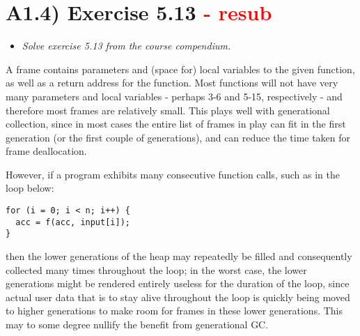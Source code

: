 
\newpage
\section{A1.4) Exercise 5.13 \textcolor{red}{- resub}}

\begin{itemize}
  \item \emph{Solve exercise 5.13 from the course compendium.}
\end{itemize}

A frame contains parameters and (space for) local variables to the given
function, as well as a return address for the function. Most functions will not
have very many parameters and local variables - perhaps 3-6 and 5-15,
respectively - and therefore most frames are relatively small. This plays well
with generational collection, since in most cases the entire list of frames in
play can fit in the first generation (or the first couple of generations), and
can reduce the time taken for frame deallocation. \smallskip

However, if a program exhibits many consecutive function calls, such as in the loop
below:

\begin{verbatim}
for (i = 0; i < n; i++) {
  acc = f(acc, input[i]);
}
\end{verbatim}

then the lower generations of the heap may repeatedly be filled and consequently
collected many times throughout the loop; in the worst case, the lower
generations might be rendered entirely useless for the duration of the loop,
since actual user data that is to stay alive throughout the loop is quickly
being moved to higher generations to make room for frames in these lower
generations. This may to some degree nullify the benefit from generational GC.


\Sectend
